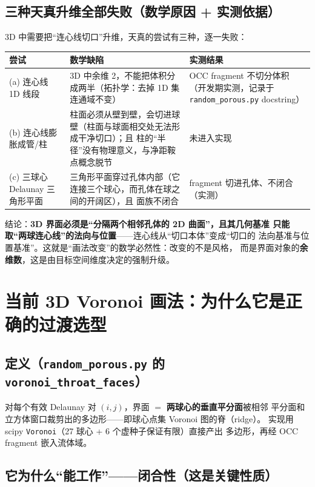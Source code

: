 \documentclass[11pt]{ctexart}
\begin{document}
\subsection{三种天真升维全部失败（数学原因 + 实测依据）}

3D 中需要把``连心线切口''升维，天真的尝试有三种，逐一失败：

\begin{center}
\begin{tabular}{p{4.2cm}p{6.2cm}p{5.2cm}}
\toprule
尝试 & 数学缺陷 & 实测结果 \\
\midrule
(a) 连心线 1D 线段 &
3D 中余维 2，不能把体积分成两半（拓扑学：去掉 1D 集连通域不变） &
OCC fragment 不切分体积（开发期实测，记录于 \texttt{random\_porous.py}
docstring） \\
(b) 连心线膨胀成管/柱 &
柱面必须从壁到壁，会切进球壁（柱面与球面相交处无法形成干净切口）；且
柱的``半径''没有物理意义，与净距鞍点概念脱节 &
未进入实现 \\
(c) 三球心 Delaunay 三角形平面 &
三角形平面穿过孔体内部（它连接三个球心，而孔体在球之间的开阔区），且
面族不闭合 &
fragment 切进孔体、不闭合（实测） \\
\bottomrule
\end{tabular}
\end{center}

结论：\textbf{3D 界面必须是``分隔两个相邻孔体的 2D 曲面''，且其几何基准
只能取``两球连心线''的法向与位置}——连心线从``切口本体''变成``切口的
法向基准与位置基准''。这就是``画法改变''的数学必然性：改变的不是风格，
而是界面对象的\textbf{余维数}，这是由目标空间维度决定的强制升级。

\section{当前 3D Voronoi 画法：为什么它是正确的过渡选型}

\subsection{定义（\texttt{random\_porous.py} 的 \texttt{voronoi\_throat\_faces}）}

对每个有效 Delaunay 对 $(i,j)$，界面 $=$ \textbf{两球心的垂直平分面}被相邻
平分面和立方体窗口裁剪出的多边形——即球心点集 Voronoi 图的脊（ridge）。
实现用 scipy \texttt{Voronoi}（27 球心 + 6 个虚种子保证有限）直接产出
多边形，再经 OCC fragment 嵌入流体域。

\subsection{它为什么``能工作''——闭合性（这是关键性质）}
\end{document}
